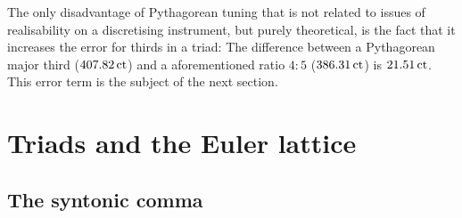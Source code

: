 \documentclass[british,11pt]{scrartcl}
\begin{document}
The only disadvantage of Pythagorean tuning that is not related to issues of
realisability on a discretising instrument, but purely theoretical, is the fact
that it increases the error for thirds in a triad: The difference between a
Pythagorean major third ($407.82\,\mathrm{ct}$) and a aforementioned ratio $4:5$
($386.31\,\mathrm{ct}$) is $21.51\,\mathrm{ct}$. This error term is the subject of the
next section.



\section{Triads and the Euler lattice}

\subsection{The syntonic comma}
\end{document}
